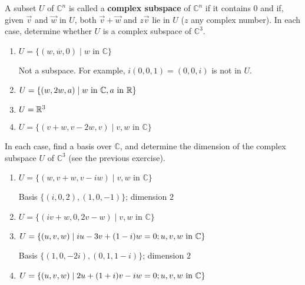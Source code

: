 \documentclass{ximera}
\begin{document}
\begin{problem}\label{prb:complex_matrices3}
A subset $U$ of $\mathbb{C}^n$ is called a \textbf{complex subspace} of $\mathbb{C}^n$ if it contains $0$ and if, given $\vec{v}$ and $\vec{w}$ in $U$, both $\vec{v} + \vec{w}$ and $z\vec{v}$ lie in $U$ ($z$ any complex number). In each case, determine whether $U$ is a complex subspace of $\mathbb{C}^3$.


\begin{enumerate}
\item $U = \{(w, \overline{w}, 0) \mid w \mbox{ in } \mathbb{C}\}$
\begin{hint}
Not a subspace. For example, $i(0, 0, 1) = (0, 0, i)$ is not in $U$.
\end{hint}

\item $U = \{(w, 2w, a) \mid w \mbox{ in } \mathbb{C}, a \mbox{ in } \mathbb{R}\}$

\item $U = \mathbb{R}^3$

\item $U = \{(v + w, v - 2w, v) \mid v, w \mbox{ in } \mathbb{C}\}$

\end{enumerate}
\end{problem}

\begin{problem}\label{prb:complex_matrices4}
In each case, find a basis over $\mathbb{C}$, and determine the dimension of the complex subspace $U$ of $\mathbb{C}^3$ (see the previous exercise).

\begin{enumerate}
\item $U = \{(w, v + w, v - iw) \mid v, w \mbox{ in } \mathbb{C}\}$
\begin{hint}
Basis $\{(i, 0, 2), (1, 0, -1)\}$; dimension $2$
\end{hint}

\item $U = \{(iv + w, 0, 2v - w) \mid v, w \mbox{ in } \mathbb{C}\}$

\item $U = \{(u, v, w) \mid  iu - 3v + (1 - i)w = 0;\  \\ u, v, w \mbox{ in } \mathbb{C}\}$
\begin{hint}
Basis $\{(1, 0, -2i), (0, 1, 1 - i)\}$; dimension $2$
\end{hint}

\item $U = \{(u, v, w) \mid 2u + (1 + i)v - iw = 0;\ \\ u, v, w \mbox{ in } \mathbb{C}\}$
\end{enumerate}
\end{problem}
\end{document}
